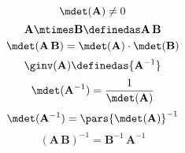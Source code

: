 {\begin{forslides}
    \begin{equation}
        \label{eq:group-fullrank-isfullrank}
        \mdet(\mathbf{A}) \neq 0
    \end{equation}
    \begin{equation}
        \label{eq:group-fullrank-composition}
        \mathbf{A} \mtimes \mathbf{B}  \definedas \mathbf{A}\,\mathbf{B}
    \end{equation}
    \begin{equation}
        \label{eq:group-fullrank-composition-det}
        \mdet(\mathbf{A} \, \mathbf{B}) = \mdet(\mathbf{A}) \cdot  \mdet(\mathbf{B})
    \end{equation}
    \begin{equation}
        \label{eq:group-fullrank-inverse}
        \ginv(\mathbf{A}) \definedas {\mathbf{A}^{-1}}
    \end{equation}
    \begin{equation}
        \label{eq:group-fullrank-inverse-det}
        \mdet(\mathbf{A}^{-1}) = \frac{1}{\mdet(\mathbf{A})}
    \end{equation}
    \begin{equation}
        \label{eq:group-fullrank-inverse-det2}
        \mdet(\mathbf{A}^{-1}) = \pars{ \mdet(\mathbf{A}) } ^ {-1}
    \end{equation}
    \begin{equation}
        \label{eq:group-fullrank-inverse-comp}
        (\mathbf{A}\,\mathbf{B})^{-1} = {\mathbf{B}^{-1} \, \mathbf{A}^{-1}}
    \end{equation}

\end{forslides}

}